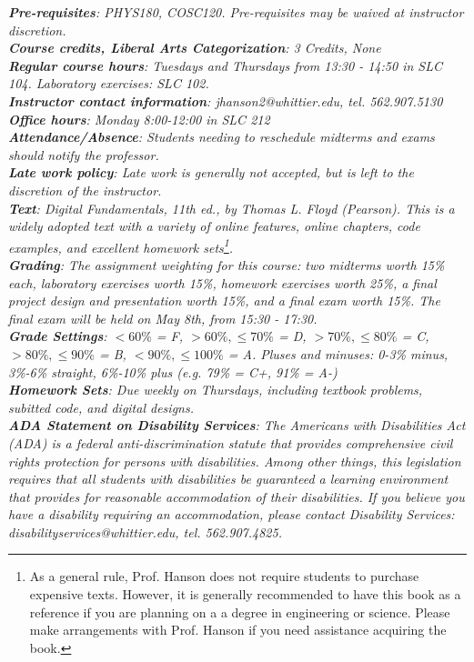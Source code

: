 \documentclass[10pt]{article}
\begin{document}
\noindent
\textit{\textbf{Pre-requisites}: PHYS180, COSC120.  Pre-requisites may be waived at instructor discretion.} \\
\textit{\textbf{Course credits, Liberal Arts Categorization}: 3 Credits, None} \\
\textit{\textbf{Regular course hours}: Tuesdays and Thursdays from 13:30 - 14:50 in SLC 104.  Laboratory exercises: SLC 102.} \\
\textit{\textbf{Instructor contact information}: jhanson2@whittier.edu, tel. 562.907.5130} \\
\textit{\textbf{Office hours}: Monday 8:00-12:00 in SLC 212} \\
\textit{\textbf{Attendance/Absence}: Students needing to reschedule midterms and exams should notify the professor.} \\ 
\textit{\textbf{Late work policy}: Late work is generally not accepted, but is left to the discretion of the instructor.} \\
\textit{\textbf{Text}:  Digital Fundamentals, 11th ed., by Thomas L. Floyd (Pearson).  This is a widely adopted text with a variety of online features, online chapters, code examples, and excellent homework sets\footnote{As a general rule, Prof. Hanson does not require students to purchase expensive texts.  However, it is generally recommended to have this book as a reference if you are planning on a a degree in engineering or science.  Please make arrangements with Prof. Hanson if you need assistance acquiring the book.}.} \\
\textit{\textbf{Grading}: The assignment weighting for this course: two midterms worth 15\% each, laboratory exercises worth 15\%, homework exercises worth 25\%, a final project design and presentation worth 15\%, and a final exam worth 15\%.  The final exam will be held on May 8th, from 15:30 - 17:30.} \\
\textit{\textbf{Grade Settings}: $<60\%$ = F, $>60\%,\leq 70\%$ = D, $>70\%,\leq80\%$ = C, $>80\%,\leq 90\%$ = B, $<90\%,\leq 100\%$ = A.  Pluses and minuses: 0-3\% minus, 3\%-6\% straight, 6\%-10\% plus (e.g. 79\% = C+, 91\% = A-)} \\
\textit{\textbf{Homework Sets}: Due weekly on Thursdays, including textbook problems, subitted code, and digital designs.} \\
\textit{\textbf{ADA Statement on Disability Services}: The Americans with Disabilities Act (ADA) is a federal anti-discrimination statute that provides comprehensive civil rights protection for persons with disabilities. Among other things, this legislation requires that all students with disabilities be guaranteed a learning environment that provides for reasonable accommodation of their disabilities. If you believe you have a disability requiring an accommodation, please contact Disability Services: disabilityservices@whittier.edu, tel. 562.907.4825.} \\
\end{document}
